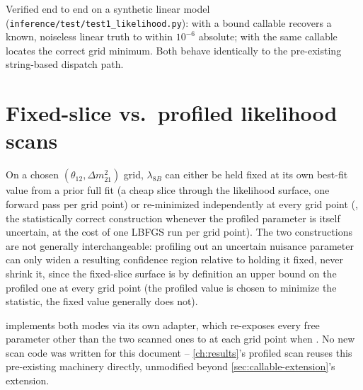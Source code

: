 \begin{resultbox}
Verified end to end on a synthetic linear model
(\texttt{inference/test/test1\_likelihood.py}):  with a
bound  callable recovers a known,
noiseless linear truth to within $10^{-6}$ absolute; 
with the same callable locates the correct grid minimum. Both behave
identically to the pre-existing string-based dispatch path.
\end{resultbox}

\section{Fixed-slice vs.\ profiled likelihood scans}
\label{sec:scan-modes}


\begin{theorybox}
On a chosen $(\theta_{12},\Delta m^2_{21})$ grid, $\lambda_{8B}$ can either
be held fixed at its own best-fit value from a prior full fit (a cheap
slice through the likelihood surface, one forward pass per grid point) or
re-minimized independently at every grid point (,
the statistically correct construction whenever the profiled parameter is
itself uncertain, at the cost of one LBFGS run per grid point). The two
constructions are not generally interchangeable: profiling out an
uncertain nuisance parameter can only widen a resulting confidence region
relative to holding it fixed, never shrink it, since the fixed-slice
surface is by definition an upper bound on the profiled one at every grid
point (the profiled value is chosen to minimize the statistic, the fixed
value generally does not).
\end{theorybox}

\begin{implbox}
 implements both
modes via its own  adapter, which re-exposes
every free parameter other than the two scanned ones to
 at each grid point when
. No new scan code was written for this
document -- \cref{ch:results}'s profiled scan reuses this pre-existing
machinery directly, unmodified beyond \cref{sec:callable-extension}'s
 extension.
\end{implbox}
